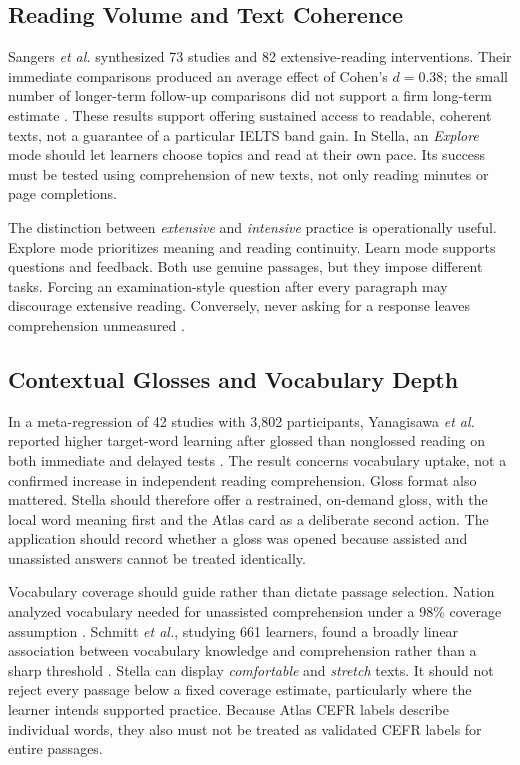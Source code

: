 \documentclass[conference,10pt]{IEEEtran}
\begin{document}
\subsection{Reading Volume and Text Coherence}
Sangers \emph{et al.} synthesized 73 studies and 82 extensive-reading interventions. Their immediate comparisons produced an average effect of Cohen's $d=0.38$; the small number of longer-term follow-up comparisons did not support a firm long-term estimate \cite{sangers2025}. These results support offering sustained access to readable, coherent texts, not a guarantee of a particular IELTS band gain. In Stella, an \emph{Explore} mode should let learners choose topics and read at their own pace. Its success must be tested using comprehension of new texts, not only reading minutes or page completions.

The distinction between \emph{extensive} and \emph{intensive} practice is operationally useful. Explore mode prioritizes meaning and reading continuity. Learn mode supports questions and feedback. Both use genuine passages, but they impose different tasks. Forcing an examination-style question after every paragraph may discourage extensive reading. Conversely, never asking for a response leaves comprehension unmeasured \cite{grabe2004,nation2007}.

\subsection{Contextual Glosses and Vocabulary Depth}
In a meta-regression of 42 studies with 3,802 participants, Yanagisawa \emph{et al.} reported higher target-word learning after glossed than nonglossed reading on both immediate and delayed tests \cite{yanagisawa2020}. The result concerns vocabulary uptake, not a confirmed increase in independent reading comprehension. Gloss format also mattered. Stella should therefore offer a restrained, on-demand gloss, with the local word meaning first and the Atlas card as a deliberate second action. The application should record whether a gloss was opened because assisted and unassisted answers cannot be treated identically.

Vocabulary coverage should guide rather than dictate passage selection. Nation analyzed vocabulary needed for unassisted comprehension under a 98\% coverage assumption \cite{nation2006}. Schmitt \emph{et al.}, studying 661 learners, found a broadly linear association between vocabulary knowledge and comprehension rather than a sharp threshold \cite{schmitt2011}. Stella can display \emph{comfortable} and \emph{stretch} texts. It should not reject every passage below a fixed coverage estimate, particularly where the learner intends supported practice. Because Atlas CEFR labels describe individual words, they also must not be treated as validated CEFR labels for entire passages.
\end{document}
